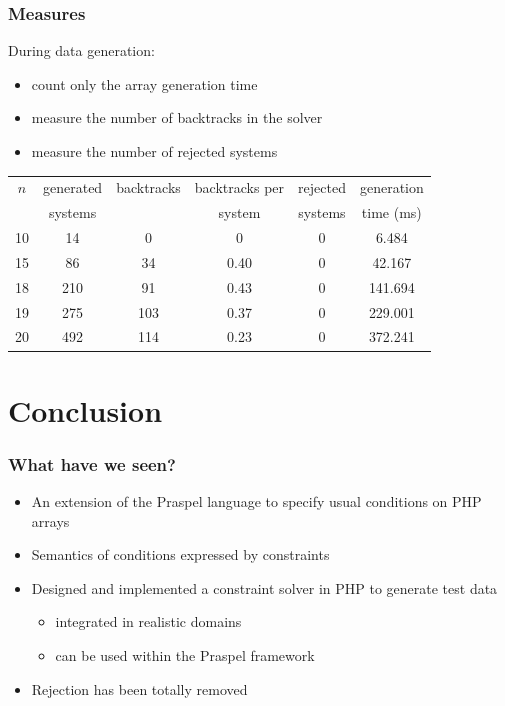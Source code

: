 \documentclass[9pt]{beamer}
\begin{document}
\begin{frame}
\frametitle{Measures}

During data generation:
\begin{itemize}
\item count only the array generation time
\item measure the number of backtracks in the solver
\item measure the number of rejected systems
\end{itemize}

\vspace{1em}
\begin{center}
\footnotesize
\begin{tabular}{|c|c|c|c|c|c|}
\hline
$n$ & generated & backtracks & backtracks per & rejected & generation \\
    & systems   &            & system         & systems  & time (ms)  \\
\hline
 10 &        14 &          0 &              0 &        0 &      6.484 \\
 15 &        86 &         34 &           0.40 &        0 &     42.167 \\
 18 &       210 &         91 &           0.43 &        0 &    141.694 \\
 19 &       275 &        103 &           0.37 &        0 &    229.001 \\
 20 &       492 &        114 &           0.23 &        0 &    372.241 \\
\hline
\end{tabular}
\end{center}

\end{frame}

\section{Conclusion}

\begin{frame}
\frametitle{What have we seen?}

\begin{itemize}
\item An extension of the Praspel language to specify usual conditions on PHP
arrays
\item Semantics of conditions expressed by constraints
\item Designed and implemented a constraint solver in PHP to generate test data
\begin{itemize}
\item integrated in realistic domains
\item can be used within the Praspel framework
\end{itemize}
\item Rejection has been totally removed
\end{itemize}

\end{frame}
\end{document}
